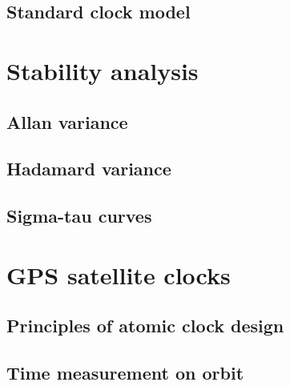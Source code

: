 \subsection{Standard clock model}


\section{Stability analysis}

\subsection{Allan variance}

\subsection{Hadamard variance}

\subsection{Sigma-tau curves}



\section{GPS satellite clocks}

\subsection{Principles of atomic clock design}

\subsection{Time measurement on orbit}


